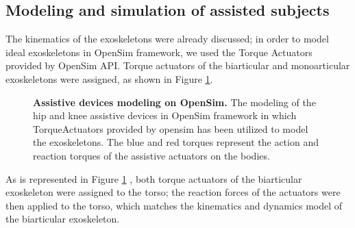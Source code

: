 \documentclass[10pt,letterpaper]{article}
\begin{document}
\subsection*{Modeling and simulation of assisted subjects}
The kinematics of the exoskeletons were already discussed; in order to model ideal exoskeletons in OpenSim framework, we used the Torque Actuators provided by OpenSim API\cite{103}. Torque actuators of the biarticular and monoarticular exoskeletons were assigned, as shown in Figure \ref{Fig_Exos_Model_Opensim}.
\begin{figure}[h!]
	\centering
	\hfil
	\vspace{1mm}
	\caption{\small{\textbf{Assistive devices modeling on OpenSim.} The modeling of the hip and knee assistive devices in OpenSim framework in which TorqueActuators provided by opensim has been utilized to model the exoskeletons. The blue and red torques represent the action and reaction torques of the assistive actuators on the bodies.}}
	\label{Fig_Exos_Model_Opensim}
\end{figure}
As is represented in Figure \ref{Fig_Exos_Model_Opensim} , both torque actuators of the biarticular exoskeleton were assigned to the torso; the reaction forces of the actuators were then applied to the torso, which matches the kinematics and dynamics model of the biarticular exoskeleton.
\end{document}
